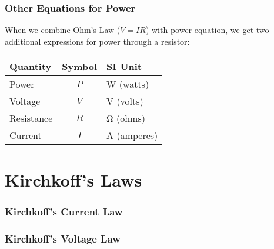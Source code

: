 \documentclass[12pt,aspectratio=169]{beamer}
\newcommand{\pic}[2]{\texttt{[image: \#2]}}
\newcommand{\eq}[2]{\vspace{#1}{\Large\begin{displaymath}#2\end{displaymath}}}
\begin{document}
\begin{frame}
  \frametitle{Other Equations for Power}
  When we combine Ohm's Law ($V=IR$) with power equation, we get two additional
  expressions for power through a resistor:

  \eq{-.2in}{
    \boxed{P=\frac{V^2}{R}}\quad\boxed{P=I^2R}
  }
  
  \begin{center}
    \begin{tabular}{l|c|l}
      \rowcolor{pink}
      \textbf{Quantity} & \textbf{Symbol} & \textbf{SI Unit} \\ \hline
      Power      & $P$ & \si{\watt} (watts) \\
      Voltage    & $V$ & \si{\volt} (volts) \\
      Resistance & $R$ & \si{\ohm} (ohms) \\
      Current    & $I$ & \si{\ampere} (amperes) \\
    \end{tabular}
  \end{center}
\end{frame}


\section{Kirchkoff's Laws}

\begin{frame}
  \frametitle{Kirchkoff's Current Law}
%
%
%
\end{frame}


\begin{frame}
  \frametitle{Kirchkoff's Voltage Law}
%
\end{frame}
\end{document}
